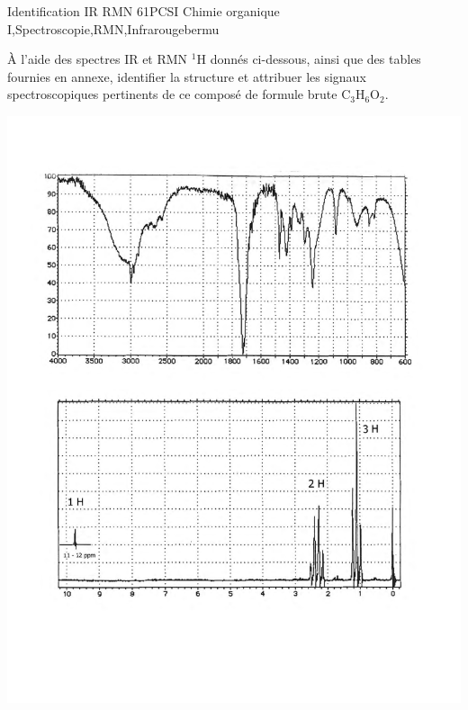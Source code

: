 \begin{exercise}{Identification IR RMN 6}{1}{PCSI}
{Chimie organique I,Spectroscopie,RMN,Infrarouge}{bermu}

À l'aide des spectres IR et RMN $^{1}$H donnés ci-dessous, ainsi que des tables fournies en annexe, identifier la structure et attribuer les signaux spectroscopiques pertinents de ce composé de formule brute $\mathrm{C_3H_6O_2}$.
 
\vspace{2em}
 
\includegraphics[width=\linewidth]{chimiePC/orga/IR_RMN_6.pdf}

\end{exercise}

\begin{solution}
\begin{center}
\end{center}
\end{solution}

